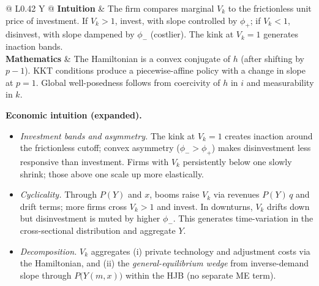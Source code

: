 ﻿\documentclass[11pt,letterpaper,oneside]{article}
\makeatletter
\numberwithin{equation}{section}
\newcommand{\TableLX}[1]{@{} L{#1} Y @{}}
\newcommand{\TableTighten}{\setlength{\tabcolsep}{5pt}\renewcommand{\arraystretch}{1.08}}
\newcommand{\TableTightBegin}{\begingroup\TableTighten}
\newcommand{\TableTightEnd}{\endgroup}
\newcommand{\1}{\mathbf{1}}
\makeatother
\begin{document}
\begin{tcolorbox}[didacticstyle]
\sloppy\footnotesize
\TableTightBegin
\begin{tabularx}{\linewidth}{\TableLX{0.42\linewidth}}
\textbf{Intuition} & The firm compares marginal $V_k$ to the frictionless unit price of investment. If $V_k>1$, invest, with slope controlled by $\phi_+$; if $V_k<1$, disinvest, with slope dampened by $\phi_-$ (costlier). The kink at $V_k=1$ generates inaction bands.\\
\textbf{Mathematics} & The Hamiltonian is a convex conjugate of $h$ (after shifting by $p-1$). KKT conditions produce a piecewise-affine policy with a change in slope at $p=1$. Global well-posedness follows from coercivity of $h$ in $i$ and measurability in $k$.
\end{tabularx}
\TableTightEnd
\end{tcolorbox}

\begin{tcolorbox}[didacticstyle]
\textbf{Economic intuition (expanded).}
\begin{itemize}[leftmargin=1.15em,itemsep=0.25em]
  \item \emph{Investment bands and asymmetry.} The kink at $V_k=1$ creates inaction around the frictionless cutoff; convex asymmetry ($\phi_->\phi_+$) makes disinvestment less responsive than investment. Firms with $V_k$ persistently below one slowly shrink; those above one scale up more elastically.
  \item \emph{Cyclicality.} Through $P(Y)$ and $x$, booms raise $V_k$ via revenues $P(Y)\,q$ and drift terms; more firms cross $V_k>1$ and invest. In downturns, $V_k$ drifts down but disinvestment is muted by higher $\phi_-$. This generates time-variation in the cross-sectional distribution and aggregate $Y$.
  \item \emph{Decomposition.} $V_k$ aggregates (i) private technology and adjustment costs via the Hamiltonian, and (ii) the \emph{general-equilibrium wedge} from inverse-demand slope through $P\big(Y(m,x)\big)$ within the HJB (no separate ME term).
\end{itemize}
\end{tcolorbox}
\end{document}
